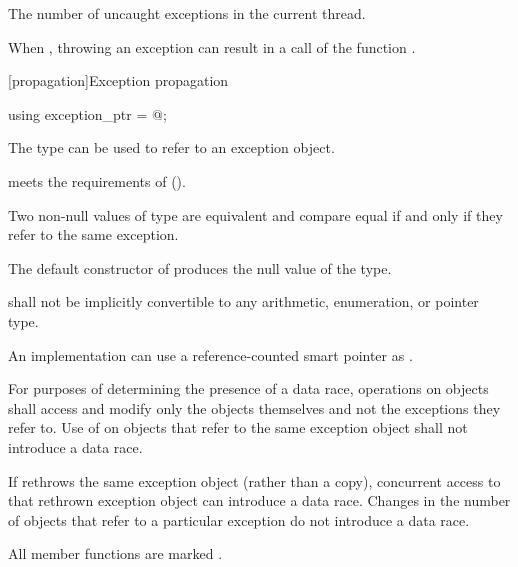 \begin{itemdescr}
\pnum
\returns
The number of uncaught exceptions in the current thread.

\pnum
\remarks
When ,
throwing an exception can result in a call of the function
.
\end{itemdescr}

[propagation]{Exception propagation}

%
\begin{itemdecl}
using exception_ptr = @\unspec@;
\end{itemdecl}

\begin{itemdescr}
\pnum
The type  can be used to refer to an exception object.

\pnum
{} meets the requirements of
 ().

\pnum
Two non-null values of type  are equivalent and compare equal if and
only if they refer to the same exception.

\pnum
The default constructor of  produces the null value of the
type.

\pnum
{} shall not be implicitly convertible to any arithmetic,
enumeration, or pointer type.

\pnum
\begin{note}
An implementation can use a reference-counted smart
pointer as .
\end{note}

\pnum
For purposes of determining the presence of a data race, operations on
 objects shall access and modify only the
 objects themselves and not the exceptions they refer to.
Use of  on  objects that refer to
the same exception object shall not introduce a data race.
\begin{note}
If
 rethrows the same exception object (rather than a copy),
concurrent access to that rethrown exception object can introduce a data race.
Changes in the number of  objects that refer to a
particular exception do not introduce a data race.
\end{note}

\pnum
All member functions are marked .
\end{itemdescr}

